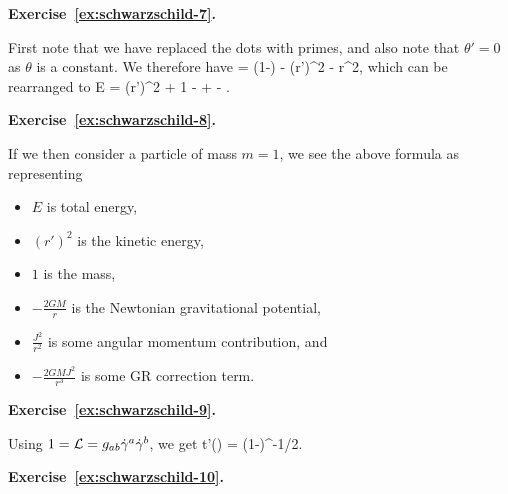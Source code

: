 \bigskip
\noindent\textbf{Exercise~\ref{ex:schwarzschild-7}.}\label{sol:schwarzschild-7}

First note that we have replaced the dots with primes, and also note that $\theta'=0$ as $\theta$ is a constant. We therefore have
 = \bigg(1-\bigg) - (r')^2 - r^2,
\ese
which can be rearranged to
\bse
    E = (r')^2 + 1 -  +  - .
\ese

\bigskip
\noindent\textbf{Exercise~\ref{ex:schwarzschild-8}.}\label{sol:schwarzschild-8}

If we then consider a particle of mass $m=1$, we see the above formula as representing
\begin{itemize}
    \item $E$ is total energy,
    \item $(r')^2$ is the kinetic energy,
    \item $1$ is the mass,
    \item $-\frac{2GM}{r}$ is the Newtonian gravitational potential,
    \item $\frac{J^2}{r^2}$ is some angular momentum contribution, and
    \item $-\frac{2GMJ^2}{r^3}$ is some GR correction term.
\end{itemize}

\bigskip
\noindent\textbf{Exercise~\ref{ex:schwarzschild-9}.}\label{sol:schwarzschild-9}

Using $1=\mathcal{L} =g_{ab}\dot{\gamma}^a\dot{\gamma}^b$, we get
\bse
    t'(\lambda) = \bigg(1-\bigg)^{-1/2}.
\ese

\bigskip
\noindent\textbf{Exercise~\ref{ex:schwarzschild-10}.}\label{sol:schwarzschild-10}

